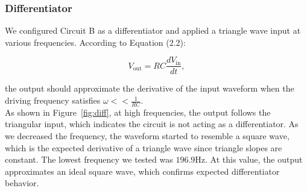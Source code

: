 \documentclass{article}
\begin{document}
\subsubsection{Differentiator}

We configured Circuit B as a differentiator and applied a triangle wave input
at various frequencies. According to Equation (2.2):

\begin{equation}
    V_\text{out}=RC\frac{dV_\text{in}}{dt},
\end{equation}

\noindent the output should approximate the derivative of the input waveform when the
driving frequency satisfies $\omega << \frac{1}{RC}$.\\

\noindent As shown in Figure~\ref{fig:diff}, at high frequencies,
the output follows the triangular input, which indicates the circuit is
not acting as a differentiator. As we decreased the frequency, the waveform
started to resemble a square wave, which is the expected derivative of a triangle wave
since triangle slopes are constant. The lowest frequency we tested was $196.9\si{\hertz}$.
At this value, the output approximates an ideal square wave, which confirms 
expected differentiator behavior.
\end{document}
